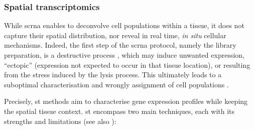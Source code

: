 \subsubsection{Spatial transcriptomics}
\label{subsec:st}


While \acrshort{scrna} enables to deconvolve cell populations within a tissue, it does not capture their spatial distribution, nor reveal in real time, \emph{in situ} cellular mechanisms. Indeed, the first step of the  \acrshort{scrna} protocol, namely the library preparation, is a destructive process \autocite{tang22}, which may induce unwanted expression, \enquote{ectopic} (expression not expected to occur in that tissue location), or resulting from the stress induced by the lysis process. This ultimately leads to a suboptimal characterisation and wrongly assignment of cell populations \autocite{vandenbrink_etal17}. 


Precisely, \acrshort{st} methods aim to characterise gene expression profiles while keeping the spatial tissue context. \acrshort{st} encompass two main techniques, each with its strengths and limitations (see also ): 

